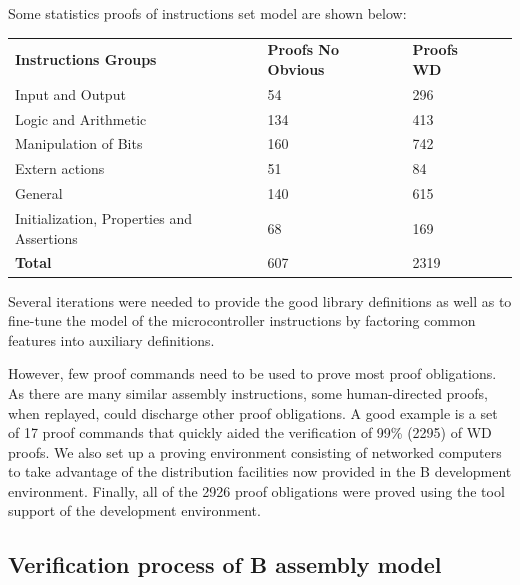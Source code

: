 \documentclass[11pt]{article} %
\begin{document}
Some statistics proofs of instructions set model are shown below:
\begin{center}
\begin{tabular}{llll}
\textbf{Instructions Groups} &  \textbf{Proofs No Obvious} & \textbf{Proofs WD}
& \\ Input and Output & 54 & 296  \\ 
Logic and Arithmetic & 134 & 413  \\ 
Manipulation of Bits & 160 & 742  \\ 
Extern actions & 51 & 84  \\
General & 140 & 615  \\
Initialization, Properties and Assertions & 68 & 169  \\
 \textbf{Total} &  607 &  2319  &  %
\end{tabular}
\end{center}



Several iterations were needed to provide the good library definitions as well as
to fine-tune the model of the microcontroller instructions by factoring common
features into auxiliary definitions.


However, few proof commands need to be used to prove most proof obligations. As
there are many similar assembly instructions, some human-directed proofs, when
replayed, could discharge other proof obligations. A good example is a set of 17
proof commands that quickly aided the verification of 99\% (2295) of WD proofs.
We also set up a proving environment consisting of networked computers to take
advantage of the distribution facilities now provided in the B development
environment. Finally, all of the 2926 proof obligations were proved using the
tool support of the development environment.


\subsection{Verification process of B assembly model }
\end{document}

